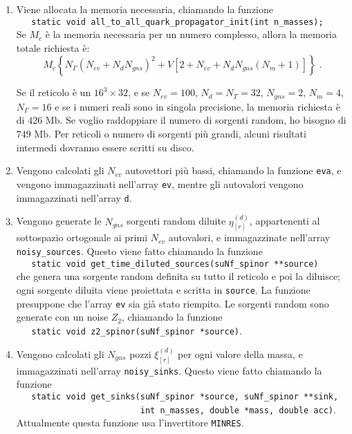 \documentclass[a4paper]{article}
\newcommand{\point}{\; .}
\begin{document}
\begin{enumerate}

\item Viene allocata la memoria necessaria, chiamando la funzione\\
\verb|   static void all_to_all_quark_propagator_init(int n_masses);|\\
Se $M_c$ \`{e} la memoria necessaria per un numero complesso, allora la memoria totale richiesta \`{e}:
$$ M_c \left\{ N_{\Gamma} \left( N_{ev} +N_d N_{gns} \right)^2 + V \left[ 2+N_{ev}+N_d N_{gns} \left(N_m+1\right) \right] \right\} \point $$

Se il reticolo \`{e} un $ 16^3 \times 32 $, e se $N_{ev}=100$, $N_d=N_T=32$, $N_{gns}=2$, $N_m = 4$, $N_\Gamma = 16 $ e se i numeri reali sono in singola precisione, la memoria richiesta \`{e} di $426 \textrm{ Mb}$. Se voglio raddoppiare il numero di sorgenti random, ho bisogno di $749 \textrm{ Mb}$. Per reticoli o numero di sorgenti pi\`{u} grandi, alcuni risultati intermedi dovranno essere scritti su disco.

\item Vengono calcolati gli $N_{ev}$ autovettori pi\`{u} bassi, chiamando la funzione \verb|eva|, e vengono immagazzinati nell'array \verb|ev|, mentre gli autovalori vengono immagazzinati nell'array \verb|d|.

\item Vengono generate le $N_{gns}$ sorgenti random diluite $\eta_{[r]}^{(d)}$, appartenenti al sottospazio ortogonale ai primi $N_{ev}$ autovalori, e immagazzinate nell'array \verb|noisy_sources|. Questo viene fatto chiamando la funzione\\
\verb|   static void get_time_diluted_sources(suNf_spinor **source)|\\
che genera una sorgente random definita su tutto il reticolo e poi la diluisce; ogni sorgente diluita viene proiettata e scritta in \verb|source|. La funzione presuppone che l'array \verb|ev| sia gi\`{a} stato riempito. Le sorgenti random sono generate con un noise $Z_2$, chiamando la funzione\\
\verb|   static void z2_spinor(suNf_spinor *source)|.\\

\item Vengono calcolati gli  $N_{gns}$ pozzi $\xi_{[r]}^{(d)}$ per ogni valore della massa, e immagazzinati nell'array \verb|noisy_sinks|. Questo viene fatto chiamando la funzione\\
\verb|   static void get_sinks(suNf_spinor *source, suNf_spinor **sink,|\\
\verb|                         int n_masses, double *mass, double acc)|.\\
Attualmente questa funzione usa l'invertitore \verb|MINRES|.


\end{enumerate}
\end{document}
